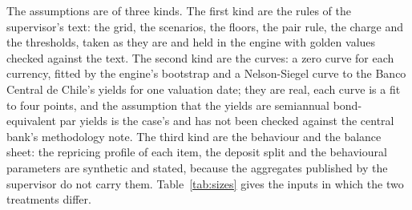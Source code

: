 The assumptions are of three kinds. The first kind are the rules of the supervisor's text: the grid, the scenarios, the floors, the pair rule, the charge and the thresholds, taken as they are and held in the engine with golden values checked against the text. The second kind are the curves: a zero curve for each currency, fitted by the engine's bootstrap and a Nelson-Siegel curve to the Banco Central de Chile's yields for one valuation date; they are real, each curve is a fit to four points, and the assumption that the yields are semiannual bond-equivalent par yields is the case's and has not been checked against the central bank's methodology note. The third kind are the behaviour and the balance sheet: the repricing profile of each item, the deposit split and the behavioural parameters are synthetic and stated, because the aggregates published by the supervisor do not carry them. Table~\ref{tab:sizes} gives the inputs in which the two treatments differ.


